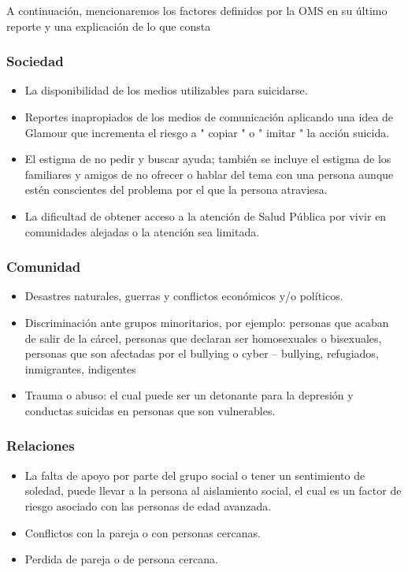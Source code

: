 {{A continuación, mencionaremos los factores definidos por la OMS en su último reporte y una explicación de lo que consta

\subsubsection{Sociedad}
{
\begin{itemize}
\item La disponibilidad de los medios utilizables para suicidarse.
\item Reportes inapropiados de los medios de comunicación aplicando una idea de Glamour que incrementa el riesgo a " copiar " o " imitar " la acción suicida.
\item El estigma de no pedir y buscar ayuda; también se incluye el estigma de los familiares y amigos de no ofrecer o hablar del tema con una persona aunque estén conscientes del problema por el que la persona atraviesa.
\item La dificultad de obtener acceso a la atención de Salud Pública por vivir en comunidades alejadas o la atención sea limitada.

\end{itemize}
}
\subsubsection{Comunidad}
{
\begin{itemize}
\item Desastres naturales, guerras y conflictos económicos y/o políticos.
\item Discriminación ante grupos minoritarios, por ejemplo: personas que acaban de salir de la cárcel, personas que declaran ser homosexuales o bisexuales, personas que son afectadas por el bullying o cyber – bullying, refugiados, inmigrantes, indigentes
\item Trauma o abuso: el cual puede ser un detonante para la depresión y conductas suicidas en personas que son vulnerables.
\end{itemize}
}
\subsubsection{Relaciones}
{
\begin{itemize}
\item La falta de apoyo por parte del grupo social o tener un sentimiento de soledad, puede llevar a la persona al aislamiento social, el cual es un factor de riesgo asociado con las personas de edad avanzada.
\item Conflictos con la pareja o con personas cercanas.
\item Perdida de pareja o de persona cercana.
\end{itemize}
}
}}
